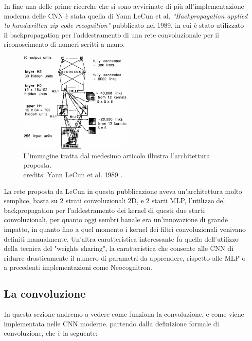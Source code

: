 In fine una delle prime ricerche che si sono avvicinate di più all'implementazione moderna delle CNN è stata quella di Yann LeCun et al.
\textit{"Backpropagation applied to handwritten zip code recognition"} \cite{LeCun1989Backpropagation} pubblicato nel 1989, in cui è stato utilizzato
il backpropagation per l'addestramento di una rete convoluzionale per il riconoscimento di numeri scritti a mano.
    \begin{figure}[h]
        \centering
        \includegraphics[width=0.5\textwidth]{imgs/lecun_network_1.png}
        \caption{L'immagine tratta dal medesimo articolo illustra l'architettura proposta.\\
        credits: Yann LeCun et al. 1989 \cite{LeCun1989Backpropagation}.}
        \label{fig:lecun_network_1}
    \end{figure}

La rete proposta da LeCun in questa pubblicazione aveva un'architettura molto semplice, basta su 2 strati convoluzionali 2D,
e 2 starti MLP, l'utilizzo del backpropagation per l'addestramento dei kernel di questi due starti convoluzionali, per quanto
oggi sembri banale era un'innovazione di grande impatto, in quanto fino a quel momento i kernel dei filtri convoluzionali
venivano definiti manualmente. Un'altra caratteristica interessante fu quella dell'utilizzo della tecnica del "weights sharing",
la caratteristica che consente alle CNN di ridurre drasticamente il numero di parametri da apprendere, rispetto alle MLP o a 
precedenti implementazioni come Neocognitron.

\subsection{La convoluzione}

In questa sezione andremo a vedere come funziona la convoluzione, e come viene implementata nelle CNN moderne. partendo dalla definizione
formale di convoluzione, che è la seguente:

